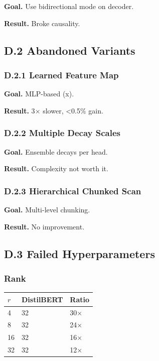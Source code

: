 \textbf{Goal.} Use bidirectional mode on decoder.

\textbf{Result.} Broke causality.

\subsection{D.2 Abandoned Variants}

\subsubsection{D.2.1 Learned Feature Map}

\textbf{Goal.} MLP-based  (x).

\textbf{Result.} 3$\times$ slower, \textless{}0.5\% gain.

\subsubsection{D.2.2 Multiple Decay Scales}

\textbf{Goal.} Ensemble decays per head.

\textbf{Result.} Complexity not worth it.

\subsubsection{D.2.3 Hierarchical Chunked Scan}

\textbf{Goal.} Multi-level chunking.

\textbf{Result.} No improvement.

\subsection{D.3 Failed Hyperparameters}

\subsubsection{Rank}

\begin{table}[H]
\centering
\small
\begin{tabular}{lll}
\toprule
\textbf{$r$} & \textbf{DistilBERT} & \textbf{Ratio} \\
\midrule
4 & 32 & 30$\times$ \\
8 & 32 & 24$\times$ \\
16 & 32 & 16$\times$ \\
32 & 32 & 12$\times$ \\
\bottomrule
\end{tabular}
\end{table}

